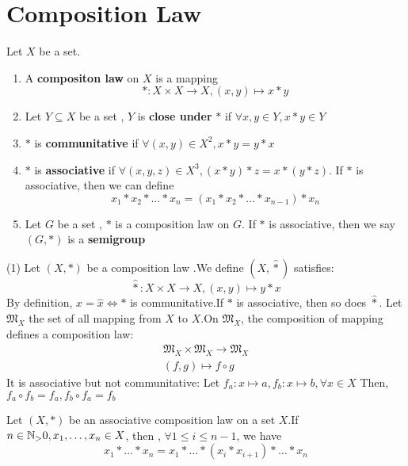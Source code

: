\documentclass{book}
\numberwithin{equation}{section}
\begin{document}
\section{Composition Law}
\begin{definitionenv}
    Let $X$ be a set.
    \begin{enumerate}[ (i)]
        \item A \textbf{compositon law} on $X$ is a mapping
        $$*:X\times X\rightarrow X, (x, y)\mapsto x * y$$
        \item Let $Y\subseteq X$ be a set ,  $Y$ is \textbf{close under } $*$ if $\forall x, y \in Y,  x*y\in Y$
        \item $*$ is \textbf{communitative} if $\forall (x, y)\in X^2, x*y=y*x$
        \item $*$ is \textbf{associative} if $\forall (x, y, z)\in X^3, (x*y)*z=x*(y*z)$.
        If $*$ is associative,  then we can define
    $$x_1*x_2*\dots *x_n=(x_1*x_2*\dots *x_{n-1})*x_n$$
    \item Let $G$ be a set ,  $*$ is a composition law on $G$. If $*$ is associative, then we say $(G, *)$ is a \textbf{semigroup}
    \end{enumerate}
    
    

\end{definitionenv}
\begin{exampleenv}
    \quad
    \newline
    (1) Let $(X, *)$ be a composition law .We define $(X, \hat{*})$ satisfies:
    $$\hat{*}:X\times X\rightarrow X,  (x, y)\mapsto y*x$$
    By definition, $x=\hat{x}\Leftrightarrow *$ is communitative.If $*$ is associative,  then so does $\hat{*}$.
    Let $\mathfrak{M} _X$ the set of all mapping from $X$ to $X$.On $\mathfrak{M} _X$, the composition of mapping defines a composition law:
    $$\begin{matrix}
\mathfrak{M} _X\times \mathfrak{M} _X\rightarrow\mathfrak{M} _X \\
(f, g)\mapsto f\circ g

\end{matrix}$$
It is associative but not communitative:
\newline
Let $f_a:x\mapsto a , f_b:x\mapsto b , \forall x\in X$ Then,  $f_a\circ f_b=f_a, f_b\circ f_a=f_b$
\end{exampleenv}
\begin{propositionenv}
    Let $(X, *)$ be an associative composition law on a set $X$.If $n\in \NN_>0, x_1, \dots, x_n\in X$,  then ,  $\forall 1\le i\le n-1$,  we have 
    $$x_1*\dots *x_n=x_1*\dots *(x_i*x_{i+1})*\dots *x_n$$
\end{propositionenv}
\end{document}
